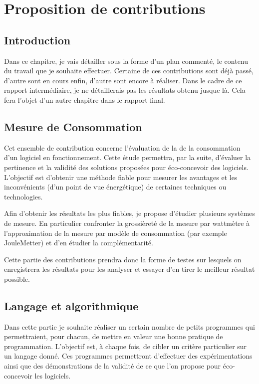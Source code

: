 \documentclass[a4paper, 11pt]{report}
\begin{document}
\chapter{Proposition de contributions}
\section{Introduction}
Dans ce chapitre, je vais détailler sous la forme d'un plan commenté, le contenu du travail que je souhaite effectuer. Certaine de ces contributions sont déjà passé, d'autre sont en cours enfin, d'autre sont encore à réaliser. Dans le cadre de ce rapport intermédiaire, je ne détaillerais pas les résultats obtenu jusque là. Cela fera l'objet d'un autre chapitre dans le rapport final.

\section{Mesure de Consommation}
Cet ensemble de contribution concerne l'évaluation de la de la consommation d'un logiciel en fonctionnement. Cette étude permettra, par la suite, d'évaluer la pertinence et la validité des solutions proposées pour éco-concevoir des logiciels. L'objectif est d'obtenir une méthode fiable pour mesurer les avantages et les inconvénients (d'un point de vue énergétique) de certaines techniques ou technologies.

Afin d'obtenir les résultats les plus fiables, je propose d'étudier plusieurs systèmes de mesure. En particulier confronter la grossièreté de la mesure par wattmètre à l'approximation de la mesure par modèle de consommation (par exemple JouleMetter) et d'en étudier la complémentarité.

Cette partie des contributions prendra donc la forme de testes sur lesquels on enregistrera les résultats pour les analyser et essayer d'en tirer le meilleur résultat possible.

\section{Langage et algorithmique}
Dans cette partie je souhaite réaliser un certain nombre de petits programmes qui permettraient, pour chacun, de mettre en valeur une bonne pratique de programmation. L'objectif est, à chaque fois, de cibler un critère particulier sur un langage donné. Ces programmes permettront d'effectuer des expérimentations ainsi que des démonstrations de la validité de ce que l'on propose pour éco-concevoir les logiciels.
\end{document}
